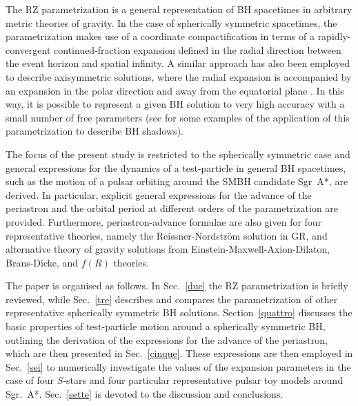 \documentclass[a4paper,aps,twocolumn,showpacs,showkeys,nofootinbib,preprintnumbers,superscriptaddress,amsmath,amssymb,amsfonts]{revtex4-1}
\begin{document}
The RZ parametrization is a general representation of
BH spacetimes in arbitrary metric theories of gravity.
In the case of
spherically symmetric spacetimes, the parametrization makes use of a
coordinate compactification in terms of a rapidly-convergent
continued-fraction expansion defined in the radial direction between the
event horizon and spatial infinity. A similar approach has also been employed
to describe axisymmetric solutions, where the radial expansion is
accompanied by an expansion in the polar direction and away from the
equatorial plane \cite{Konoplya2016a}. In this way, it is possible to
represent a given BH solution to very high accuracy with a small number
of free parameters (see \cite{Younsi2016,Mizuno2017} for some examples of the
application of this parametrization to describe BH shadows).

The focus of the present study is restricted to the spherically symmetric
case and general expressions for the dynamics of a
test-particle in general BH spacetimes, such as the motion
of a pulsar orbiting around the SMBH candidate Sgr~A*, are derived.
In particular, explicit general expressions for the advance of the periastron
and the orbital period at different orders of the
parametrization are provided.
Furthermore, periastron-advance formulae are also given for four
representative theories, namely the Reissner-Nordstr\"{o}m solution
in GR, and alternative theory of gravity solutions from
Einstein-Maxwell-Axion-Dilaton, Brans-Dicke, and $f(R)$ theories.

The paper is organised as follows. In Sec.~\ref{due}
the RZ parametrization \cite{Rezzolla2014} is briefly reviewed,
while Sec.~\ref{tre} describes and compares the parametrization of other
representative spherically symmetric BH solutions. 
Section~\ref{quattro} discusses
the basic properties of test-particle motion around a
spherically symmetric BH, outlining the derivation of the expressions for
the advance of the periastron, which are then presented in Sec.~\ref{cinque}.  
These expressions are then employed
in Sec.~\ref{sei} to numerically investigate the values of the expansion
parameters in the case of four $S$-stars and four particular
representative pulsar toy models around Sgr.~A*.
Sec.~\ref{sette} is devoted to the discussion and conclusions.

\end{document}
